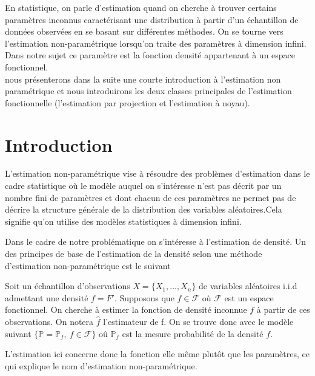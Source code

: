 \documentclass[
]{book}
\theoremstyle{definition}
\theoremstyle{definition}
\theoremstyle{definition}
\theoremstyle{definition}
\theoremstyle{remark}
\begin{document}
\hspace*{0.5cm} En statistique, on parle d'estimation quand on cherche à trouver certains paramètres inconnus caractérisant une distribution à partir d'un échantillon de données observées en se basant sur différentes méthodes.
On se tourne vers l'estimation non-paramétrique lorsqu'on traite des paramètres à dimension infini. Dans notre sujet ce paramètre est la fonction densité appartenant à un espace fonctionnel.\\
\hspace*{0.5cm} nous présenterons dans la suite une courte introduction
à l'estimation non paramétrique et nous introduirons les deux classes
principales de l'estimation fonctionnelle (l'estimation par projection
et l'estimation à noyau).

\hypertarget{introduction}{%
\section{Introduction}\label{introduction}}

L'estimation non-paramétrique vise à résoudre des problèmes d'estimation dans le cadre statistique où le modèle auquel on s'intéresse n'est pas décrit par un nombre fini de paramètres et dont chacun de ces paramètres ne permet pas de décrire la structure générale de la distribution des variables aléatoires.\newline Cela signifie qu'on utilise des modèles statistiques à dimension infini.

Dans le cadre de notre problématique on s'intéresse à l'estimation de densité.\newline
Un des principes de base de l'estimation de la densité selon une méthode d'estimation non-paramétrique est le suivant \newline

Soit un échantillon d'observations \(X=\{X_1, \dots,X_n\}\) de variables aléatoires i.i.d admettant une densité \(f= F'\). Supposons que \(f \in \mathcal F\) où \(\mathcal{F}\) est un espace fonctionnel. On cherche à estimer la fonction de densité inconnue \(f\) à partir de ces observations.\newline
On notera \(\hat f\) l'estimateur de f.\newline
On se trouve donc avec le modèle suivant \(\{\mathbb P=\mathbb P_f,~f \in \mathcal F\}\)
oû \(\mathbb P_f\) est la mesure probabilité de la densité \(f\).

L'estimation ici concerne donc la fonction elle même plutôt que les paramètres, ce qui explique le nom d'estimation non-paramétrique.\newline
\end{document}

